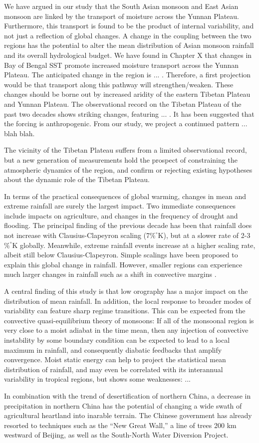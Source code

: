	We have argued in our study that the South Asian monsoon and East Asian monsoon are linked by the transport of moisture across the Yunnan Plateau. Furthermore, this transport is found to be the product of internal variability, and not just a reflection of global changes. A change in the coupling between the two regions has the potential to alter the mean distribution of Asian monsoon rainfall and its overall hydrological budget. We have found in Chapter X that changes in Bay of Bengal SST promote increased moisture transport across the Yunnan Plateau. The anticipated change in the region is ... . Therefore, a first projection would be that transport along this pathway will strengthen/weaken. These changes should be borne out by increased aridity of the eastern Tibetan Plateau and Yunnan Plateau. The observational record on the Tibetan Plateau of the past two decades shows striking changes, featuring ... . It has been suggested that the forcing is anthropogenic. From our study, we project a continued pattern ... blah blah.
	
	The vicinity of the Tibetan Plateau suffers from a limited observational record, but a new generation of measurements hold the prospect of constraining the atmospheric dynamics of the region, and confirm or rejecting existing hypotheses about the dynamic role of the Tibetan Plateau.
 
	In terms of the practical consequences of global warming, changes in mean and extreme rainfall are surely the largest impact. Two immediate consequences include impacts on agriculture, and changes in the frequency of drought and flooding. The principal finding of the previous decade has been that rainfall does not increase with Clausius-Clapeyron scaling (7$\%^{\circ}$K), but at a slower rate of 2-3$\%^{\circ}$K globally. Meanwhile, extreme rainfall events increase at a higher scaling rate, albeit still below Clausius-Clapeyron. Simple scalings have been proposed to explain this global change in rainfall. However, smaller regions can experience much larger changes in rainfall such as a shift in convective margins \cite{Lintner2007}.

	A central finding of this study is that low orography has a major impact on the distribution of mean rainfall. In addition, the local response to broader modes of variability can feature sharp regime transitions. This can be expected from the convective quasi-equilibrium theory of monsoons: If all of the monsoonal region is very close to a moist adiabat in the time mean, then any injection of convective instability by some boundary condition can be expected to lead to a local maximum in rainfall, and consequently diabatic feedbacks that amplify convergence. Moist static energy can help to project the statistical mean distribution of rainfall, and may even be correlated with its interannual variability in tropical regions, but shows some weaknesses: ...

	In combination with the trend of desertification of northern China, a decrease in precipitation in northern China has the potential of changing a wide swath of agricultural heartland into inarable terrain. The Chinese government has already resorted to techniques such as the ``New Great Wall,'' a line of trees 200 km westward of Beijing, as well as the South-North Water Diversion Project.